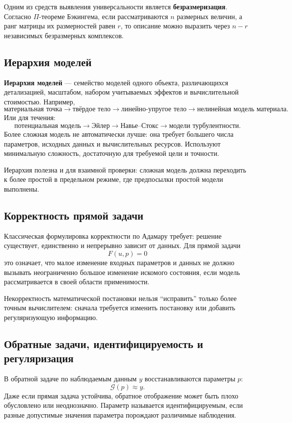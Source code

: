 Одним из средств выявления универсальности является \textbf{безразмеризация}. Согласно $\Pi$-теореме Бэкингема, если рассматриваются $n$ размерных величин, а ранг матрицы их размерностей равен $r$, то описание можно выразить через $n-r$ независимых безразмерных комплексов.

\subsection{Иерархия моделей}

\textbf{Иерархия моделей} --- семейство моделей одного объекта, различающихся детализацией, масштабом, набором учитываемых эффектов и вычислительной стоимостью. Например,
\[
\text{материальная точка}
\rightarrow
\text{твёрдое тело}
\rightarrow
\text{линейно-упругое тело}
\rightarrow
\text{нелинейная модель материала}.
\]
Или для течения:
\[
\text{потенциальная модель}
\rightarrow
\text{Эйлер}
\rightarrow
\text{Навье--Стокс}
\rightarrow
\text{модели турбулентности}.
\]
Более сложная модель не автоматически лучше: она требует большего числа параметров, исходных данных и вычислительных ресурсов. Используют минимальную сложность, достаточную для требуемой цели и точности.

Иерархия полезна и для взаимной проверки: сложная модель должна переходить к более простой в предельном режиме, где предпосылки простой модели выполнены.


\subsection{Корректность прямой задачи}

Классическая формулировка корректности по Адамару требует: решение существует,
единственно и непрерывно зависит от данных. Для прямой задачи
\[
F(u,p)=0
\]
это означает, что малое изменение входных параметров и данных не должно вызывать
неограниченно большое изменение искомого состояния, если модель рассматривается
в своей области применимости.

Некорректность математической постановки нельзя ``исправить'' только более
точным вычислителем: сначала требуется изменить постановку или добавить
регуляризующую информацию.

\subsection{Обратные задачи, идентифицируемость и регуляризация}

В обратной задаче по наблюдаемым данным $y$ восстанавливаются параметры $p$:
\[
\mathcal G(p)\approx y.
\]
Даже если прямая задача устойчива, обратное отображение может быть плохо
обусловлено или неоднозначно. Параметр называется идентифицируемым, если разные
допустимые значения параметра порождают различимые наблюдения.

